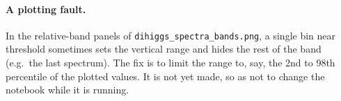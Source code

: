 \documentclass[11pt]{article}
\newcommand{\file}[1]{\nolinkurl{#1}}
\begin{document}
\paragraph{A plotting fault.} In the relative-band panels of
\file{dihiggs_spectra_bands.png}, a single bin near threshold sometimes sets the vertical
range and hides the rest of the band (e.g.\ the last spectrum). The fix is to limit the
range to, say, the 2nd to 98th percentile of the plotted values. It is not yet made, so
as not to change the notebook while it is running.
\end{document}
